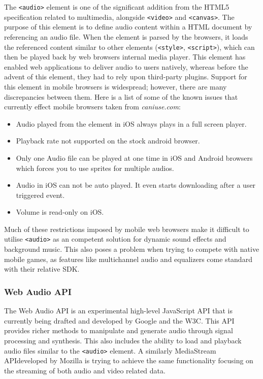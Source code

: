 \documentclass[final]{cmpreport}
\begin{document}
The \texttt{<audio>} element is one of the significant addition from the HTML5 specification related to multimedia, alongside \texttt{<video>} and \texttt{<canvas>}. The purpose of this element is to define audio content within a HTML document by referencing an audio file. When the element is parsed by the browsers, it loads the referenced content similar to other elements (\texttt{<style>}, \texttt{<script>}), which can then be played back by web browsers internal media player. This element has enabled web applications to deliver audio to users natively, whereas before the advent of this element, they had to rely upon third-party plugins. Support for this element in mobile browsers is widespread; however, there are many discrepancies between them. Here is a list of some of the known issues that currently effect mobile browsers taken from \textit{caniuse.com\footnotemark}:


\begin{itemize}
  \item Audio played from the element in iOS always plays in a full screen player.
  \item Playback rate not supported on the stock android browser.
  \item Only one Audio file can be played at one time in iOS and Android browsers which forces you to use sprites for multiple audios.
  \item Audio in iOS can not be auto played. It even starts downloading after a user triggered event.
  \item Volume is read-only on iOS.
\end{itemize}

Much of these restrictions imposed by mobile web browsers make it difficult to utilise \texttt{<audio>} as an competent solution for dynamic sound effects and background music. This also poses a problem when trying to compete with native mobile games, as features like multichannel audio and equalizers come standard with their relative SDK.

\subsubsection{Web Audio API}
The Web Audio API is an experimental high-level JavaScript API that is currently being drafted and developed by Google and the W3C\footnotemark. This API provides richer methods to manipulate and generate audio through signal processing and synthesis. This also includes the ability to load and playback audio files similar to the \texttt{<audio>} element. A similarly MediaStream API\footnotemark developed by Mozilla is trying to achieve the same functionality focusing on the streaming of both audio and video related data.
\end{document}
